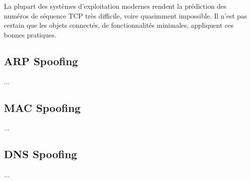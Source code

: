 La plupart des systèmes d'exploitation modernes rendent la prédiction des numéros de séquence TCP très difficile, voire quasimment impossible. Il n'est pas certain que les objets connectés, de fonctionnalités minimales, appliquent ces bonnes pratiques.



\subsection{ARP Spoofing}\label{vulnerabilites:reseau:spoofing:arp}

...

\subsection{MAC Spoofing}\label{vulnerabilites:reseau:spoofing:mac}

...

\subsection{DNS Spoofing}\label{vulnerabilites:reseau:spoofing:dns}

...

\endinput
